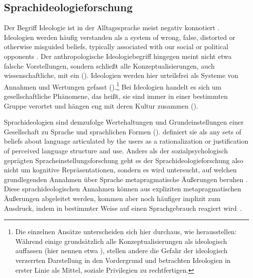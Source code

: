 \subsection{Sprachideologieforschung}
\label{sec:Sprachideologieforschung}
Der Begriff Ideologie ist in der Alltagssprache meist negativ konnotiert \citep[s.][124--127]{Silverstein1998}. Ideologien werden häufig verstanden als \glqq a system of wrong, false, distorted or otherwise misguided beliefs, typically associated with our social or political opponents\grqq{} \citep[2]{vanDijk.1998}. 
Der anthropologische Ideologiebegriff hingegen meint nicht etwa falsche Vorstellungen, sondern schließt alle Konzeptualisierungen, auch wissenschaftliche, mit ein (\cites[s.][312]{Silverstein1992}[124]{Silverstein1998}). 
Ideologien werden hier urteilsfrei als Systeme von Annahmen und Wertungen gefasst (\cites[s.][3]{vanDijk.1998}[12]{Gal.2019}).\footnote{Die einzelnen Ansätze unterscheiden sich hier durchaus, wie \citet[56--57]{Woolard1994} herausstellen: Während einige grundsätzlich alle Konzeptualisierungen als ideologisch auffassen (hier nennen \citeauthor{Woolard1994} etwa \citealp{Rumsey.1990}), stellen andere die Gefahr der ideologisch verzerrten Darstellung in den Vordergrund und betrachten Ideologien in erster Linie als Mittel, soziale Privilegien zu rechtfertigen.} 
Bei Ideologien handelt es sich um gesellschaftliche Phänomene, das heißt, sie sind immer in einer bestimmten Gruppe verortet und hängen eng mit deren Kultur zusammen (\cites[s.][312]{Silverstein1992}[3]{vanDijk.1998}).

Sprachideologien sind demzufolge Wertehaltungen und Grundeinstellungen einer Gesellschaft zu Sprache und sprachlichen Formen (\cites[s.][]{Silverstein1979}{Silverstein1992}{Silverstein1998}{Kroskrity.2010}{Spitzmuller2013}). 
\citet[193]{Silverstein1979} definiert sie als \glqq any sets of beliefs about language articulated by the users as a rationalization or justification of perceived language structure and use\grqq{}. 
Anders als der sozialpsychologisch geprägten Spracheinstellungsforschung geht es der Sprachideologieforschung also nicht um kognitive Repräsentationen, sondern es wird untersucht, auf welchen grundlegenden Annahmen über Sprache metapragmatische Äußerungen beruhen \citep[s.][223]{Silverstein.1985}. 
Diese sprachideologischen Annahmen können aus expliziten metapragmatischen {\"A}u{\ss}erungen abgeleitet werden, kommen aber noch h{\"a}ufiger implizit zum Ausdruck, indem in bestimmter Weise auf einen Sprachgebrauch reagiert wird~\citep[s.][116]{Gal.2016}.

